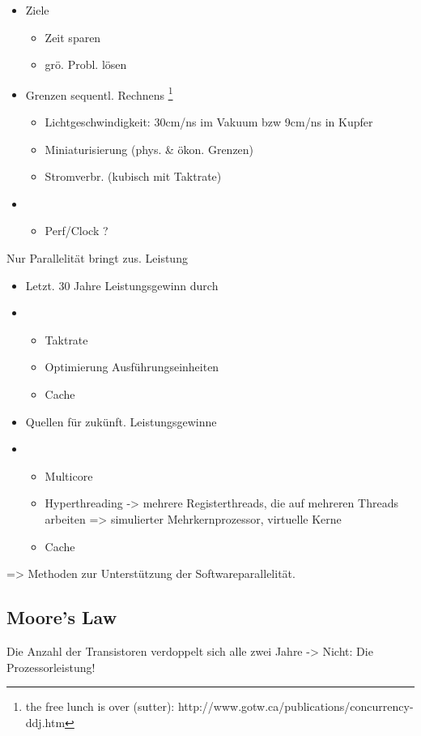 \begin{itemize}
	\item  Ziele
		\begin{itemize}
			\item Zeit sparen
			\item grö. Probl. lösen
		\end{itemize}
	\item  Grenzen sequentl. Rechnens \footnote{the free lunch is over (sutter):
		http://www.gotw.ca/publications/concurrency-ddj.htm}
		\begin{itemize}
			\item Lichtgeschwindigkeit: 30cm/ns im Vakuum bzw 9cm/ns in Kupfer
			\item Miniaturisierung (phys. \& ökon. Grenzen)
			\item Stromverbr. (kubisch mit Taktrate)
		\end{itemize}
	\item 
		\begin{itemize}
			\item Perf/Clock ?
		\end{itemize}
\end{itemize}

Nur Parallelität bringt zus. Leistung
\begin{itemize}
	\item  Letzt. 30 Jahre Leistungsgewinn durch
	\item 
		\begin{itemize}
			\item Taktrate
			\item Optimierung Ausführungseinheiten
			\item Cache
		\end{itemize}
	\item  Quellen für zukünft. Leistungsgewinne
	\item 
		\begin{itemize}
			\item Multicore
			\item Hyperthreading -> mehrere Registerthreads, die auf mehreren Threads arbeiten => simulierter Mehrkernprozessor, virtuelle Kerne
			\item Cache
		\end{itemize}
\end{itemize}

=> Methoden zur Unterstützung der Softwareparallelität.

\subsection{Moore's Law}
Die Anzahl der Transistoren verdoppelt sich alle zwei Jahre
-> Nicht: Die Prozessorleistung!

